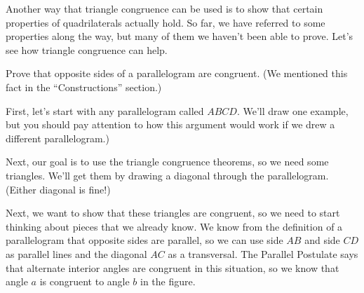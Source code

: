 \documentclass{ximera}
\begin{document}
Another way that triangle congruence can be used is to show that certain properties of quadrilaterals actually hold. So far, we have referred to some properties along the way, but many of them we haven't been able to prove. Let's see how triangle congruence can help.

\begin{example}
Prove that opposite sides of a parallelogram are congruent. (We mentioned this fact in the ``Constructions'' section.)

First, let's start with any parallelogram called $ABCD$. We'll draw one example, but you should pay attention to how this argument would work if we drew a different parallelogram.)
\begin{image}\end{image}
Next, our goal is to use the triangle congruence theorems, so we need some triangles. We'll get them by drawing a diagonal through the parallelogram. (Either diagonal is fine!)
\begin{image}\end{image}
Next, we want to show that these triangles are congruent, so we need to start thinking about pieces that we already know. We know from the definition of a parallelogram that opposite sides are parallel, so we can use side $AB$ and side $CD$ as parallel lines and the diagonal $AC$ as a transversal. The Parallel Postulate says that alternate interior angles are congruent in this situation, so we know that angle $a$ is congruent to angle $b$ in the figure.
\begin{image}\end{image}

\end{example}
\end{document}
